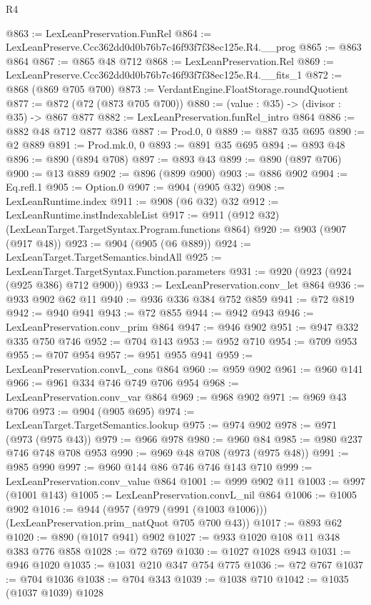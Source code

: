 \begin{lexlean}{R4}
\begin{coremodule}
@863 := LexLeanPreservation.FunRel
@864 := LexLeanPreserve.Ccc362dd0d0b76b7c46f93f7f38ec125e.R4.__prog
@865 := @863 @864
@867 := @865 @48 @712
@868 := LexLeanPreservation.Rel
@869 := LexLeanPreserve.Ccc362dd0d0b76b7c46f93f7f38ec125e.R4.__fits_1
@872 := @868 (@869 @705 @700)
@873 := VerdantEngine.FloatStorage.roundQuotient
@877 := @872 (@72 (@873 @705 @700))
@880 := (value : @35) -> (divisor : @35) -> @867 @877
@882 := LexLeanPreservation.funRel_intro @864
@886 := @882 @48 @712 @877 @386
@887 := Prod.{0, 0}
@889 := @887 @35 @695
@890 := @2 @889
@891 := Prod.mk.{0, 0}
@893 := @891 @35 @695
@894 := @893 @48
@896 := @890 (@894 @708)
@897 := @893 @43
@899 := @890 (@897 @706)
@900 := @13 @889
@902 := @896 (@899 @900)
@903 := @886 @902
@904 := Eq.refl.{1}
@905 := Option.{0}
@907 := @904 (@905 @32)
@908 := LexLeanRuntime.index
@911 := @908 (@6 @32) @32
@912 := LexLeanRuntime.instIndexableList
@917 := @911 (@912 @32) (LexLeanTarget.TargetSyntax.Program.functions @864)
@920 := @903 (@907 (@917 @48))
@923 := @904 (@905 (@6 @889))
@924 := LexLeanTarget.TargetSemantics.bindAll
@925 := LexLeanTarget.TargetSyntax.Function.parameters
@931 := @920 (@923 (@924 (@925 @386) @712 @900))
@933 := LexLeanPreservation.conv_let @864
@936 := @933 @902 @62 @11
@940 := @936 @336 @384 @752 @859
@941 := @72 @819
@942 := @940 @941
@943 := @72 @855
@944 := @942 @943
@946 := LexLeanPreservation.conv_prim @864
@947 := @946 @902
@951 := @947 @332 @335 @750 @746
@952 := @704 @143
@953 := @952 @710
@954 := @709 @953
@955 := @707 @954
@957 := @951 @955 @941
@959 := LexLeanPreservation.convL_cons @864
@960 := @959 @902
@961 := @960 @141
@966 := @961 @334 @746 @749 @706 @954
@968 := LexLeanPreservation.conv_var @864
@969 := @968 @902
@971 := @969 @43 @706
@973 := @904 (@905 @695)
@974 := LexLeanTarget.TargetSemantics.lookup
@975 := @974 @902
@978 := @971 (@973 (@975 @43))
@979 := @966 @978
@980 := @960 @84
@985 := @980 @237 @746 @748 @708 @953
@990 := @969 @48 @708 (@973 (@975 @48))
@991 := @985 @990
@997 := @960 @144 @86 @746 @746 @143 @710
@999 := LexLeanPreservation.conv_value @864
@1001 := @999 @902 @11
@1003 := @997 (@1001 @143)
@1005 := LexLeanPreservation.convL_nil @864
@1006 := @1005 @902
@1016 := @944 (@957 (@979 (@991 (@1003 @1006))) (LexLeanPreservation.prim_natQuot @705 @700 @43))
@1017 := @893 @62
@1020 := @890 (@1017 @941) @902
@1027 := @933 @1020 @108 @11 @348 @383 @776 @858
@1028 := @72 @769
@1030 := @1027 @1028 @943
@1031 := @946 @1020
@1035 := @1031 @210 @347 @754 @775
@1036 := @72 @767
@1037 := @704 @1036
@1038 := @704 @343
@1039 := @1038 @710
@1042 := @1035 (@1037 @1039) @1028

\end{coremodule}
\end{lexlean}
